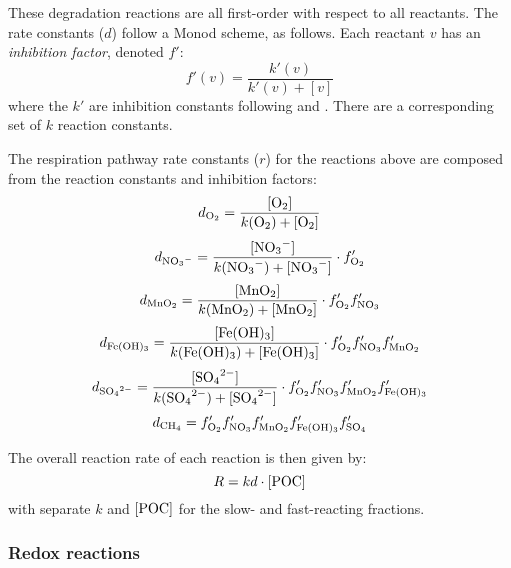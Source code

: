 \documentclass[a4paper]{article}
\begin{document}
These degradation reactions are all first-order with respect to all reactants.  The rate constants ($d$) follow a Monod scheme, as follows.  Each reactant $v$ has an \textit{inhibition factor}, denoted $f'$:
\begin{equation}
  f'(v) = \frac{k'(v)}{k'(v) + [v]}
\end{equation}
where the $k'$ are inhibition constants following \citet{soetaert_model_1996} and \citet{van_cappellen_cycling_1996}.  There are a corresponding set of $k$ reaction constants.

The respiration pathway rate constants ($r$) for the reactions above are composed from the reaction constants and inhibition factors:
\begin{equation}
  d_{\ce{O2}} = \frac{[\ce{O2}]}{k(\ce{O2}) + [\ce{O2}]}
\end{equation}
\begin{equation}
  d_{\ce{NO3-}} = \frac{[\ce{NO3-}]}{k(\ce{NO3-}) + [\ce{NO3-}]} \cdot f'_{\ce{O2}}
\end{equation}
\begin{equation}
  d_{\ce{MnO2}} = \frac{[\ce{MnO2}]}{k(\ce{MnO2}) + [\ce{MnO2}]} \cdot f'_{\ce{O2}} f'_{\ce{NO3}}
\end{equation}
\begin{equation}
  d_{\ce{Fe(OH)3}} = \frac{[\ce{Fe(OH)3}]}{k(\ce{Fe(OH)3}) + [\ce{Fe(OH)3}]} \cdot f'_{\ce{O2}} f'_{\ce{NO3}} f'_{\ce{MnO2}}
\end{equation}
\begin{equation}
  d_{\ce{SO4^2-}} = \frac{[\ce{SO4^2-}]}{k(\ce{SO4^2-}) + [\ce{SO4^2-}]} \cdot f'_{\ce{O2}} f'_{\ce{NO3}} f'_{\ce{MnO2}} f'_{\ce{Fe(OH)3}}
\end{equation}
\begin{equation}
  d_{\ce{CH4}} = f'_{\ce{O2}} f'_{\ce{NO3}} f'_{\ce{MnO2}} f'_{\ce{Fe(OH)3}} f'_{\ce{SO4}}
\end{equation}

The overall reaction rate of each reaction is then given by:
\begin{equation}
  R = k d \cdot [\ce{POC}]
\end{equation}
with separate $k$ and $[\ce{POC}]$ for the slow- and fast-reacting fractions.

\subsubsection{Redox reactions}
\end{document}
